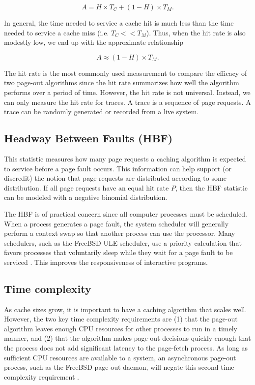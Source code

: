   \begin{equation*}
    A = H \times T_C + (1 - H) \times T_M .
  \end{equation*}

  In general, the time needed to service a cache hit is much less than the time
  needed to service a cache miss (i.e. $T_C << T_M$). Thus, when the hit rate is
  also modestly low, we end up with the approximate relationship

  \begin{equation*}
    A \approx (1 - H) \times T_M .
  \end{equation*}

  The hit rate is the most commonly used measurement to compare the efficacy
  of two page-out algorithms since the hit rate summarizes how well the
  algorithm performs over a period of time. However, the hit rate is not
  universal. Instead, we can only measure the hit rate for traces. A trace is a
  sequence of page requests. A trace can be randomly generated or recorded from
  a live system.

\subsection{Headway Between Faults (HBF)}
  This statistic measures how many page requests a caching algorithm is expected
  to service before a page fault occurs. This information can help support (or
  discredit) the notion that page requests are distributed according to some
  distribution. If all page requests have an equal hit rate $P$, then the
  HBF statistic can be modeled with a negative binomial distribution.

  The HBF is of practical concern since all computer processes must be
  scheduled. When a process generates a page fault, the system scheduler will
  generally perform a context swap so that another process can use the
  processor. Many schedulers, such as the FreeBSD ULE scheduler, use a priority
  calculation that favors processes that voluntarily sleep while they wait for a
  page fault to be serviced \cite{roberson2003ule}. This improves the
  responsiveness of interactive programs.

\subsection{Time complexity}
  As cache sizes grow, it is important to have a caching algorithm that scales
  well. However, the two key time complexity requirements are (1) that the page-out
  algorithm leaves enough CPU resources for other processes to run in a timely
  manner, and (2) that the algorithm makes page-out decisions quickly enough that
  the process does not add significant latency to the page-fetch process. As
  long as sufficient CPU resources are available to a system, an asynchronous
  page-out process, such as the FreeBSD page-out daemon, will negate this second
  time complexity requirement \cite{mckusick2004design}.

